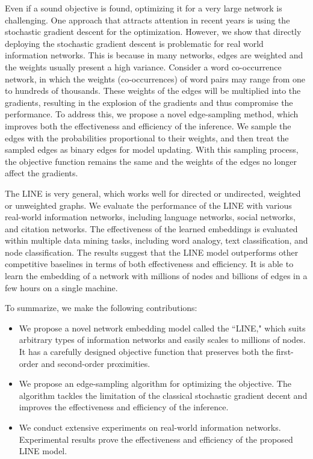 \documentclass{sig-alternate-2013}
\begin{document}
Even if a sound objective is found, optimizing it for a very large network is challenging. One approach that attracts attention in recent years is using the stochastic gradient descent for the optimization. However, we show that directly deploying the stochastic gradient descent is problematic for real world information networks. This is because in many networks, edges are weighted and the weights usually present a high variance. Consider a word co-occurrence network, in which the weights (co-occurrences) of word pairs may range from one to hundreds of thousands. These weights of the edges will be multiplied into the gradients, resulting in the explosion of the gradients and thus compromise the performance. To address this, we propose a novel edge-sampling method, which improves both the effectiveness and efficiency of the inference. We sample the edges with the probabilities proportional to their weights, and then treat the sampled edges as binary edges for model updating. With this sampling process, the objective function remains the same and the weights of the edges no longer affect the gradients.  


The LINE is very general, which works well for directed or undirected, weighted or unweighted graphs. We evaluate the performance of the LINE with various real-world information networks, including language networks, social networks, and citation networks. The effectiveness of the learned embeddings is evaluated within multiple data mining tasks, including word analogy, text classification, and node classification. The results suggest that the LINE model outperforms other competitive baselines in terms of both effectiveness and efficiency. It is able to learn the embedding of a network with millions of nodes and billions of edges in a few hours on a single machine. 

To summarize, we make the following contributions:
\begin{itemize}
	\item We propose a novel network embedding model called the ``LINE," which suits arbitrary types of information networks and easily scales to millions of nodes. It has a carefully designed objective function that preserves both the first-order and second-order proximities.  
	\item We propose an edge-sampling algorithm for optimizing the objective. The algorithm tackles the limitation of the classical stochastic gradient decent and improves the effectiveness and efficiency of the inference.  
	\item We conduct extensive experiments on real-world information networks. Experimental results prove the effectiveness and efficiency of the proposed LINE model. 
\end{itemize}
\end{document}
